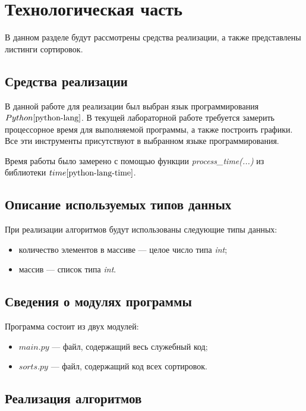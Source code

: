 \chapter{Технологическая часть}

В данном разделе будут рассмотрены средства реализации, а также представлены листинги сортировок.

\section{Средства реализации}
В данной работе для реализации был выбран язык программирования $Python \cite{python-lang}$. В текущей лабораторной работе требуется замерить процессорное время для выполняемой программы, а также построить графики. Все эти инструменты присутствуют в выбранном языке программирования.

Время работы было замерено с помощью функции \textit{process\_time(...)} из библиотеки $time \cite{python-lang-time}$.

\section{Описание используемых типов данных}

При реализации алгоритмов будут использованы следующие типы данных:

\begin{itemize}
	\item количество элементов в массиве --- целое число типа \textit{int};
	\item массив --- список типа \textit{int}.
\end{itemize}

\section{Сведения о модулях программы}
Программа состоит из двух модулей:
\begin{itemize}
	\item $main.py$ --- файл, содержащий весь служебный код;
    \item $sorts.py$ --- файл, содержащий код всех сортировок. \newline
\end{itemize}


\section{Реализация алгоритмов}

